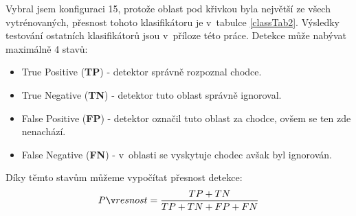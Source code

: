 Vybral jsem konfiguraci 15, protože oblast pod křivkou byla největší ze všech vytrénovaných, přesnost tohoto klasifikátoru je v~tabulce \ref{classTab2}. Výsledky testování ostatních klasifikátorů jsou v~příloze této práce. Detekce může nabývat maximálně 4 stavů:
\begin{itemize}
	\item{True Positive (\textbf{TP}) - detektor správně rozpoznal chodce.}
	\item{True Negative (\textbf{TN}) - detektor tuto oblast správně ignoroval.}
	\item{False Positive (\textbf{FP}) - detektor označil tuto oblast za chodce, ovšem se ten zde nenachází.}
	\item{False Negative (\textbf{FN}) - v~oblasti se vyskytuje chodec avšak byl ignorován.}
\end{itemize}
Díky těmto stavům můžeme vypočítat přesnost detekce:
\begin{equation*}
\centering
 \label{eq:accuracy}
 \begin{aligned}
 Přesnost = \frac{TP + TN}{TP + TN + FP + FN}
 \end{aligned}
\end{equation*}

